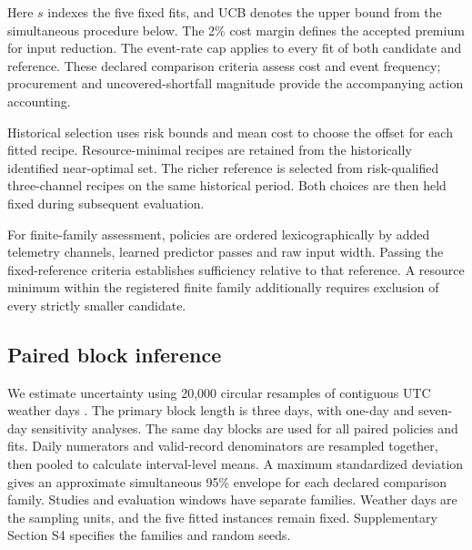 Here $s$ indexes the five fixed fits, and UCB denotes the upper bound from the simultaneous procedure below. The 2\% cost margin defines the accepted premium for input reduction. The event-rate cap applies to every fit of both candidate and reference. These declared comparison criteria assess cost and event frequency; procurement and uncovered-shortfall magnitude provide the accompanying action accounting.

Historical selection uses risk bounds and mean cost to choose the offset for each fitted recipe. Resource-minimal recipes are retained from the historically identified near-optimal set. The richer reference is selected from risk-qualified three-channel recipes on the same historical period. Both choices are then held fixed during subsequent evaluation.

For finite-family assessment, policies are ordered lexicographically by added telemetry channels, learned predictor passes and raw input width. Passing the fixed-reference criteria establishes sufficiency relative to that reference. A resource minimum within the registered finite family additionally requires exclusion of every strictly smaller candidate.

\subsection{Paired block inference}
We estimate uncertainty using 20,000 circular resamples of contiguous UTC weather days \cite{kunsch1989jackknife}. The primary block length is three days, with one-day and seven-day sensitivity analyses. The same day blocks are used for all paired policies and fits. Daily numerators and valid-record denominators are resampled together, then pooled to calculate interval-level means. A maximum standardized deviation gives an approximate simultaneous 95\% envelope for each declared comparison family. Studies and evaluation windows have separate families. Weather days are the sampling units, and the five fitted instances remain fixed. Supplementary Section S4 specifies the families and random seeds.
